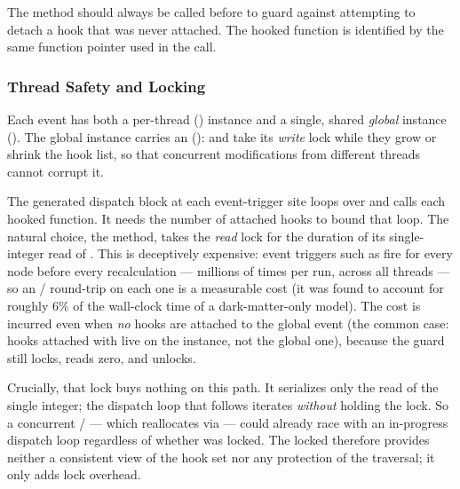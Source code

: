 The  method should always be called before  to guard against attempting to detach a hook that was never attached. The hooked function is identified by the same function pointer used in the  call.

\subsubsection{Thread Safety and Locking}\label{sec:eventHooksLocking}

Each event has both a per-thread () instance and a single, shared \emph{global} instance (). The global instance carries an  ():  and  take its \emph{write} lock while they grow or shrink the hook list, so that concurrent modifications from different threads cannot corrupt it.

The generated dispatch block at each event-trigger site loops over  and calls each hooked function. It needs the number of attached hooks to bound that loop. The natural choice, the  method, takes the \emph{read} lock for the duration of its single-integer read of . This is deceptively expensive: event triggers such as  fire for every node before every recalculation --- millions of times per run, across all threads --- so an / round-trip on each one is a measurable cost (it was found to account for roughly $6\%$ of the wall-clock time of a dark-matter-only model). The cost is incurred even when \emph{no} hooks are attached to the global event (the common case: hooks attached with  live on the  instance, not the global one), because the guard still locks, reads zero, and unlocks.

Crucially, that lock buys nothing on this path. It serializes only the read of the single  integer; the dispatch loop that follows iterates  \emph{without} holding the lock. So a concurrent / --- which reallocates  via  --- could already race with an in-progress dispatch loop regardless of whether  was locked. The locked  therefore provides neither a consistent view of the hook set nor any protection of the traversal; it only adds lock overhead.

